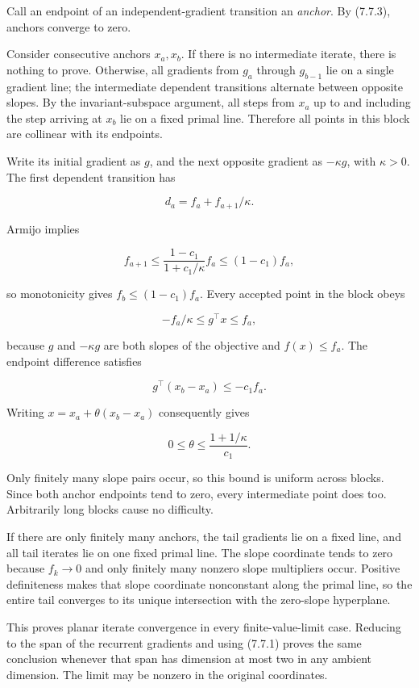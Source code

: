 Call an endpoint of an independent-gradient transition an \emph{anchor}.
By (7.7.3), anchors converge to zero.

Consider consecutive anchors \(x_a,x_b\). If there is no intermediate
iterate, there is nothing to prove. Otherwise, all gradients from
\(g_a\) through \(g_{b-1}\) lie on a single gradient line; the
intermediate dependent transitions alternate between opposite slopes. By
the invariant-subspace argument, all steps from \(x_a\) up to and
including the step arriving at \(x_b\) lie on a fixed primal line.
Therefore all points in this block are collinear with its endpoints.

Write its initial gradient as \(g\), and the next opposite gradient as
\(-\kappa g\), with \(\kappa>0\). The first dependent transition has

\[
d_a=f_a+f_{a+1}/\kappa.
\]

Armijo implies

\[
f_{a+1}\le\frac{1-c_1}{1+c_1/\kappa}f_a
\le(1-c_1)f_a,
\]

so monotonicity gives \(f_b\le(1-c_1)f_a\). Every accepted point in the
block obeys

\[
-f_a/\kappa\le g^\top x\le f_a,
\]

because \(g\) and \(-\kappa g\) are both slopes of the objective and
\(f(x)\le f_a\). The endpoint difference satisfies

\[
g^\top(x_b-x_a)\le-c_1 f_a.
\]

Writing \(x=x_a+\theta(x_b-x_a)\) consequently gives

\[
0\le\theta\le\frac{1+1/\kappa}{c_1}.
\]

Only finitely many slope pairs occur, so this bound is uniform across
blocks. Since both anchor endpoints tend to zero, every intermediate
point does too. Arbitrarily long blocks cause no difficulty.

If there are only finitely many anchors, the tail gradients lie on a
fixed line, and all tail iterates lie on one fixed primal line. The
slope coordinate tends to zero because \(f_k\to0\) and only finitely
many nonzero slope multipliers occur. Positive definiteness makes that
slope coordinate nonconstant along the primal line, so the entire tail
converges to its unique intersection with the zero-slope hyperplane.

This proves planar iterate convergence in every finite-value-limit case.
Reducing to the span of the recurrent gradients and using (7.7.1) proves
the same conclusion whenever that span has dimension at most two in any
ambient dimension. The limit may be nonzero in the original coordinates.


